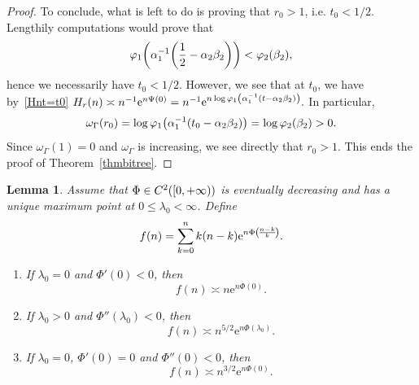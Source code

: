 \documentclass[10pt]{amsart}
\newtheorem{lemm}[theo]{Lemma}\newtheorem{prop}[theo]{Proposition}\newtheorem{coro}[theo]{Corollary}\newtheorem{conj}[theo]{Conjecture}
\theoremstyle{definition}\newtheorem{defi}[theo]{Definition}\newtheorem{rema}[theo]{Remark}\newtheorem{exam}[theo]{Example}\newtheorem{exem}[theo]{Example}\newtheorem{nota}[theo]{Notation}
\newcommand{\rme}{\mathrm{e}}
\let\originalleft\left
\let\originalright\right
\renewcommand{\left}{\mathopen{}\mathclose\bgroup\originalleft}
\renewcommand{\right}{\aftergroup\egroup\originalright}
\let\oldin\in
\renewcommand{\in}{\mathchoice{\oldin}{\oldin}{\,\oldin\,}{\,\oldin\,}}
\newcommand*{\relabel}{\renewcommand{\labelenumi}{(\theenumi)}}
\newcommand*{\romanenumi}{\renewcommand*{\theenumi}{\roman{enumi}}\relabel}
\begin{document}
\begin{proof}
To conclude, what is left to do is proving that $r_0>1$, i.e. $t_0<1/2$. Lengthily computations would prove that
\[
\varphi_1 \left(\alpha_1^{-1} \left(\frac{1}{2} - \alpha_2 \beta_2 \right) \right) < \varphi_2(\beta_2),
\]
hence we necessarily have $t_0<1/2$.
However, we see that at $t_0$, we have by~\eqref{Hnt=t0} $ H_r(n) \asymp n^{-1} \rme^{n \Psi(0)} = n^{-1} \rme^{n \log \varphi_1 \left(\alpha_1^{-1} \left(t - \alpha_2 \beta_2 \right) \right)}. $ In particular,
\[
\omega_\Gamma(r_0)=\log \varphi_1 \left(\alpha_1^{-1} \left(t_0 - \alpha_2 \beta_2 \right) \right)=\log \varphi_2(\beta_2)>0.
\]
Since $\omega_\Gamma(1)=0$ and $\omega_\Gamma$ is increasing, we see directly that $r_0>1$. This ends the proof of Theorem~\ref{thmbitree}. \end{proof}



\begin{lemm}\label{asymptotics}
Assume that $\Phi \in C^2 \left([0, +\infty) \right)$ is eventually decreasing and has a unique maximum point at $0 \leq \lambda_0 < \infty$. Define
\[
f(n) = \sum_{k = 0}^n k (n - k) \rme^{n \Phi \left(\!\frac{n - k}{k}\!\right)}.
\]
\begin{enumerate}\romanenumi
\item\label{lemm3.3.1} If $\lambda_0 = 0$ and $\Phi'(0) < 0$, then
\[
f(n) \asymp n \rme^{n \Phi(0)}.
\]
\item\label{lemm3.3.2} If $\lambda_0 > 0$ and $\Phi''(\lambda_0) < 0$, then
\[
f(n) \asymp n^{5/2} \rme^{n \Phi(\lambda_0)}.
\]
\item\label{lemm3.3.3} If $\lambda_0 = 0$, $\Phi'(0) = 0$ and $\Phi''(0) < 0$, then
\[
f(n) \asymp n^{3/2} \rme^{n \Phi(0)}.
\]
\end{enumerate}
\end{lemm}
\end{document}

